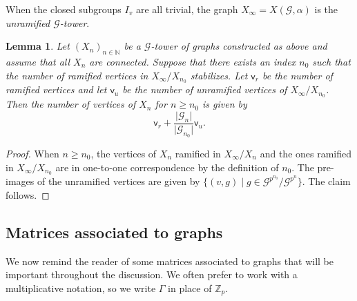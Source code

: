 \documentclass{amsart}
\newtheorem{lemma}[theorem]{Lemma}
\numberwithin{equation}{section}
\theoremstyle{remark}
\newcommand{\Z}{\mathbb{Z}}
\newcommand{\cG}{\mathcal{G}}
\theoremstyle{plain} %
\begin{document}
When the closed subgroups $I_v$ are all trivial, the graph $X_\infty = X(\cG,\alpha)$ is the \emph{unramified $\cG$-tower}.

\begin{lemma}
\label{lemma:number of vertices}
Let $(X_n)_{n\in \mathbb{N}}$ be a $\mathcal{G}$-tower of graphs constructed as above and assume that all $X_n$ are connected.
Suppose that there exists an index $n_0$ such that the number of ramified vertices in $X_\infty/X_{n_0}$ stabilizes.
Let {$\mathsf{v}_r$} be the number of ramified vertices and let {$\mathsf{v}_u$} be the number of unramified vertices of $X_\infty/X_{n_0}$.
Then the number of vertices of $X_n$ for $n\ge n_0 $ is given by
\[
\mathsf{v}_r+\frac{\vert \mathcal{G}_n\vert }{\vert \mathcal{G}_{n_0}\vert } \mathsf{v}_u.
\]
\end{lemma}

\begin{proof}
When $n\ge n_0$, the vertices of $X_n$ ramified in $X_\infty/X_n$ and the ones ramified in $X_\infty/X_{n_0}$ are in one-to-one correspondence by the definition of $n_0$.
The pre-images of the unramified vertices are given by $\{(v,g)\mid g\in \mathcal{G}^{p^{n_0}}/\mathcal{G}^{p^n}\}$. 
The claim follows. 
\end{proof}

\subsection{Matrices associated to graphs}
We now remind the reader of some matrices associated to graphs that will be important throughout the discussion.
{We often prefer to work with a multiplicative notation, so we write $\Gamma$ in place of $\Z_p$.}
\end{document}
